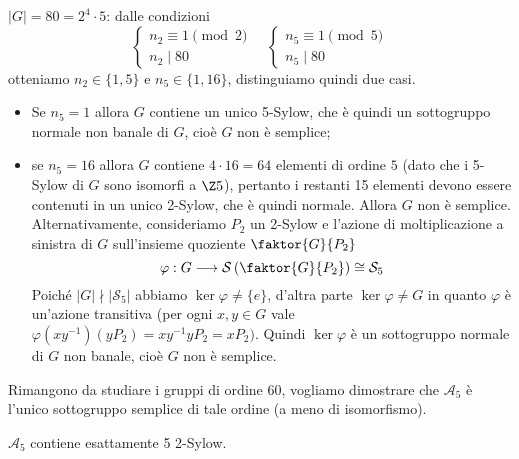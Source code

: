 \documentclass[11pt]{scrartcl}
\begin{document}
	\underline{$|G| = 80 = 2^4\cdot 5$}: dalle condizioni
	\[
	\begin{cases}
		n_2 \equiv 1 \pmod 2\\
		n_2 \mid 80
	\end{cases}\quad
	\begin{cases}
		n_5 \equiv 1 \pmod 5\\
		n_5 \mid 80
	\end{cases}
	\]
	otteniamo $n_2 \in \{1, 5\}$ e $n_5 \in \{1, 16\}$, distinguiamo quindi due
	casi.
	\begin{itemize}
		\item Se $n_5 = 1$ allora $G$ contiene un unico 5-Sylow, che è quindi un
		sottogruppo normale non banale di $G$, cioè $G$ non è semplice;
		\item se $n_5 = 16$ allora $G$ contiene $4\cdot 16 = 64$ elementi di ordine
		$5$ (dato che i 5-Sylow di $G$ sono isomorfi a $\Z5$), pertanto i restanti
		15 elementi devono essere contenuti in un unico 2-Sylow, che è quindi normale.
		Allora $G$ non è semplice. \newline Alternativamente, consideriamo $P_2$ un 2-Sylow
		e l'azione di moltiplicazione a sinistra di $G$ sull'insieme quoziente $\faktor{G}{P_2}$
		\[
		\varphi: G\longrightarrow\mathcal{S}\left(\faktor{G}{P_2}\right) \cong \mathcal{S}_5
		\]
		Poiché $|G| \nmid |\mathcal{S}_5|$ abbiamo $\ker\varphi\neq\{e\}$, d'altra parte
		$\ker\varphi \neq G$ in quanto $\varphi$ è un'azione transitiva (per 
		ogni $x, y \in G$ vale $\varphi(xy^{-1})(yP_2) = xy^{-1}yP_2 = xP_2)$.
		Quindi $\ker\varphi$ è un sottogruppo normale di $G$ non banale, cioè $G$
		non è semplice. 
	\end{itemize}
	
	Rimangono da studiare i gruppi di ordine $60$, vogliamo dimostrare che 
	$\mathcal{A}_5$ è l'unico sottogruppo semplice di tale ordine (a meno di isomorfismo).
	
	\begin{lemma}
		$\mathcal{A}_5$ contiene esattamente 5 2-Sylow.
	\end{lemma}
	
\end{document}
